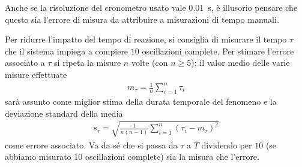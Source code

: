 \documentclass{lab1-article}
\begin{document}
\begin{article}

Anche se la risoluzione del cronometro usato vale 0.01~s, \`e illusorio
pensare che questo sia l'errore di misura da attribuire a misurazioni di tempo
manuali.

Per ridurre l'impatto del tempo di reazione, si consiglia
di misurare il tempo $\tau$ che il sistema impiega a compiere $10$
oscillazioni complete. Per stimare l'errore associato a $\tau$ si ripeta la
misure $n$ volte (con $n \geq 5$); il valor medio delle varie misure effettuate
\begin{align}
  m_{\tau} = \frac{1}{n}\sum_{i = 1}^n \tau_i
\end{align}
sar\`a assunto come miglior stima della durata temporale del fenomeno e la
deviazione standard della media
\begin{align}
  s_\tau = \sqrt{\frac{1}{n(n-1)}\sum_{i = 1}^n(\tau_i - m_\tau)^2}
\end{align}
come errore associato.
Va da s\'e che si passa da $\tau$ a $T$ dividendo per $10$ (se abbiamo
misurato $10$ oscillazioni complete) sia la misura che l'errore.

\onecolumn



\end{article}
\end{document}
